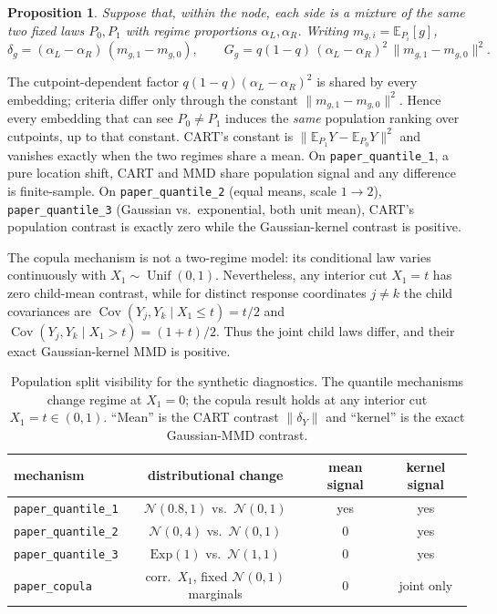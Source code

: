 \documentclass[11pt]{article}
\newtheorem{proposition}{Proposition}
\theoremstyle{remark}
\begin{document}
\begin{proposition}\label{prop:visibility}
Suppose that, within the node, each side is a mixture of the same two fixed laws
$P_0,P_1$ with regime proportions $\alpha_L,\alpha_R$.  Writing
$m_{g,i}=\mathbb E_{P_i}[g]$,
\[
  \delta_g = (\alpha_L-\alpha_R)\,(m_{g,1}-m_{g,0}),
  \qquad
  G_g = q(1-q)\,(\alpha_L-\alpha_R)^2\,\|m_{g,1}-m_{g,0}\|^2 .
\]
\end{proposition}

The cutpoint-dependent factor $q(1-q)(\alpha_L-\alpha_R)^2$ is shared by every
embedding; criteria differ only through the constant $\|m_{g,1}-m_{g,0}\|^2$.
Hence every embedding that can see $P_0\neq P_1$ induces the \emph{same}
population ranking over cutpoints, up to that constant.  CART's constant is
$\|\mathbb E_{P_1}Y-\mathbb E_{P_0}Y\|^2$ and vanishes exactly when the two
regimes share a mean.  On \texttt{paper\_quantile\_1}, a pure
location shift, CART and MMD share population signal and any difference is
finite-sample.  On \texttt{paper\_quantile\_2} (equal means, scale
$1\!\to\!2$), \texttt{paper\_quantile\_3} (Gaussian vs.\ exponential, both unit
mean), CART's population contrast is exactly zero while the Gaussian-kernel
contrast is positive.

The copula mechanism is not a two-regime model: its conditional law varies
continuously with $X_1\sim\operatorname{Unif}(0,1)$.  Nevertheless, any interior
cut $X_1=t$ has zero child-mean contrast, while for distinct response coordinates
$j\ne k$ the child covariances are
$\operatorname{Cov}(Y_j,Y_k\mid X_1\le t)=t/2$ and
$\operatorname{Cov}(Y_j,Y_k\mid X_1>t)=(1+t)/2$.  Thus the joint child laws
differ, and their exact Gaussian-kernel MMD is positive.

\begin{table}[h]
  \centering
  \caption{Population split visibility for the synthetic diagnostics.  The
  quantile mechanisms change regime at $X_1=0$; the copula result holds at any
  interior cut $X_1=t\in(0,1)$.  ``Mean'' is the CART contrast
  $\|\delta_Y\|$ and ``kernel'' is the exact Gaussian-MMD contrast.}
  \label{tab:signal}
  \begin{tabular}{lccc}
    \toprule
    mechanism & distributional change & mean signal & kernel signal \\
    \midrule
    \texttt{paper\_quantile\_1} & $\mathcal N(0.8,1)$ vs.\ $\mathcal N(0,1)$ & yes & yes \\
    \texttt{paper\_quantile\_2} & $\mathcal N(0,4)$ vs.\ $\mathcal N(0,1)$ & $0$ & yes \\
    \texttt{paper\_quantile\_3} & $\mathrm{Exp}(1)$ vs.\ $\mathcal N(1,1)$ & $0$ & yes \\
    \texttt{paper\_copula} & corr.\ $X_1$, fixed $\mathcal N(0,1)$ marginals & $0$ & joint only \\
    \bottomrule
  \end{tabular}
\end{table}
\end{document}
